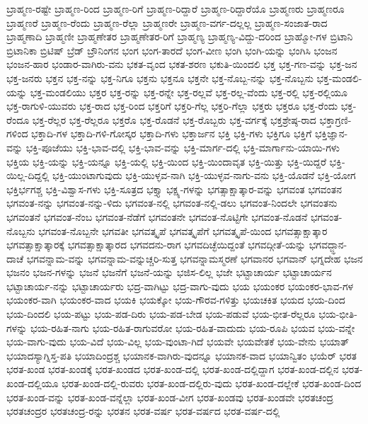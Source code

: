 {ಬ್ರಾಹ್ಮಣ-ರಷ್ಟೇ
ಬ್ರಾಹ್ಮಣ-ರಿಂದ
ಬ್ರಾಹ್ಮಣ-ರಿಗೆ
ಬ್ರಾಹ್ಮಣ-ರಿದ್ದಾರೆ
ಬ್ರಾಹ್ಮಣ-ರಿದ್ದಾರೆಯೊ
ಬ್ರಾಹ್ಮಣರು
ಬ್ರಾಹ್ಮಣರೂ
ಬ್ರಾಹ್ಮಣರೆ
ಬ್ರಾಹ್ಮಣ-ರೆಂದು
ಬ್ರಾಹ್ಮಣ-ರೆಲ್ಲಾ
ಬ್ರಾಹ್ಮಣರೇ
ಬ್ರಾಹ್ಮಣ-ವರ್ಗ-ದಲ್ಲಲ್ಲ
ಬ್ರಾಹ್ಮಣ-ಸಂಜಾತ-ರಾದ
ಬ್ರಾಹ್ಮಣಾದಿ
ಬ್ರಾಹ್ಮಣೀ
ಬ್ರಾಹ್ಮಣೇತರ
ಬ್ರಾಹ್ಮಣೇತರ-ರಿಗೆ
ಬ್ರಾಹ್ಮಣ್ಯ
ಬ್ರಾಹ್ಮಣ್ಯ-ವಿದ್ದು-ದರಿಂದ
ಬ್ರಾಹ್ಮೋ-ಗಳ
ಬ್ರಿಟಾನಿ
ಬ್ರಿಟಾನಿಕಾ
ಬ್ರಿಟಿಷ್
ಬ್ರೆಡ್
ಬ್ರೌನಿಂಗನ
ಭಂಗ
ಭಂಗ-ತಾರದೆ
ಭಂಗ-ವೀಣ
ಭಂಗಿ
ಭಂಗಿ-ಯನ್ನು
ಭಂಗಿಸಿ
ಭಂಜನ
ಭಂಜನ-ಹಾರ
ಭಂಡಾರ-ವಾಗಿರು-ವನು
ಭಕತ-ವೃಂದ
ಭಕತ-ಶರಣ
ಭಕುತಿ-ಯಿಂದಲಿ
ಭಕ್ತ
ಭಕ್ತ-ಗಣ-ವನ್ನು
ಭಕ್ತ-ಜನ
ಭಕ್ತ-ಜನರು
ಭಕ್ತನ
ಭಕ್ತ-ನನ್ನು
ಭಕ್ತ-ನಿಗೂ
ಭಕ್ತನು
ಭಕ್ತನೂ
ಭಕ್ತನೇ
ಭಕ್ತ-ನೊಬ್ಬ-ನನ್ನು
ಭಕ್ತ-ನೊಬ್ಬನು
ಭಕ್ತ-ಮಂಡಲಿ-ಯನ್ನು
ಭಕ್ತ-ಮಂಡಲಿಯು
ಭಕ್ತರ
ಭಕ್ತ-ರನ್ನು
ಭಕ್ತ-ರನ್ನೇ
ಭಕ್ತ-ರಲ್ಲವೆ
ಭಕ್ತ-ರಲ್ಲ-ವೆಂದು
ಭಕ್ತ-ರಲ್ಲಿ
ಭಕ್ತ-ರಲ್ಲಿಯೂ
ಭಕ್ತ-ರಾಗುಳಿ-ಯುವರು
ಭಕ್ತ-ರಾದ
ಭಕ್ತ-ರಿಂದ
ಭಕ್ತರಿಗೆ
ಭಕ್ತರಿ-ಗೆಲ್ಲ
ಭಕ್ತರಿ-ಗೆಲ್ಲಾ
ಭಕ್ತರು
ಭಕ್ತರೂ
ಭಕ್ತ-ರೆಂದು
ಭಕ್ತ-ರೆಂದೂ
ಭಕ್ತ-ರೆಲ್ಲರ
ಭಕ್ತ-ರೆಲ್ಲರೂ
ಭಕ್ತರೊ
ಭಕ್ತ-ರೊಡನೆ
ಭಕ್ತ-ರೊಬ್ಬರು
ಭಕ್ತ-ವರ್ಗಕ್ಕೆ
ಭಕ್ತಶ್ರೇಷ್ಠ-ರಾದ
ಭಕ್ತಾಗ್ರಣಿ-ಗಳಿಂದ
ಭಕ್ತಾದಿ-ಗಳ
ಭಕ್ತಾದಿ-ಗಳಿ-ಗೋಸ್ಕರ
ಭಕ್ತಾದಿ-ಗಳು
ಭಕ್ತಾರ್ಜನ
ಭಕ್ತಿ
ಭಕ್ತಿ-ಗಳು
ಭಕ್ತಿಗೂ
ಭಕ್ತಿಗೆ
ಭಕ್ತಿಜ್ಞಾನ-ವನ್ನು
ಭಕ್ತಿ-ಪೂಜೆಯು
ಭಕ್ತಿ-ಭಾವ-ದಲ್ಲಿ
ಭಕ್ತಿ-ಭಾವ-ವನ್ನು
ಭಕ್ತಿ-ಮಾರ್ಗ-ದಲ್ಲಿ
ಭಕ್ತಿ-ಮಾರ್ಗಾನು-ಯಾಯಿ-ಗಳು
ಭಕ್ತಿಯ
ಭಕ್ತಿ-ಯನ್ನು
ಭಕ್ತಿ-ಯನ್ನೂ
ಭಕ್ತಿ-ಯಲ್ಲಿ
ಭಕ್ತಿ-ಯಿಂದ
ಭಕ್ತಿ-ಯಿಂದಾವೃತ
ಭಕ್ತಿ-ಯಿತ್ತು
ಭಕ್ತಿ-ಯಿದ್ದರೆ
ಭಕ್ತಿ-ಯಿಲ್ಲ-ದಿದ್ದಲ್ಲಿ
ಭಕ್ತಿ-ಯುಂಟಾಗುವುದು
ಭಕ್ತಿ-ಯುಳ್ಳವ-ನಾಗಿ
ಭಕ್ತಿ-ಯುಳ್ಳವ-ನಾಗು-ವನು
ಭಕ್ತಿ-ಯೊಡನೆ
ಭಕ್ತಿ-ಯೋಗ
ಭಕ್ತಿರ್ಭಗಶ್ಚ
ಭಕ್ತಿ-ವಿಶ್ವಾಸ-ಗಳು
ಭಕ್ತಿ-ಸೂತ್ರದ
ಭಕ್ತ್ಯಾ
ಭಕ್ಷ್ಯ-ಗಳನ್ನು
ಭಗತ್ಸಾಕ್ಷಾತ್ಕಾರ-ವನ್ನು
ಭಗವಂತ
ಭಗವಂತನ
ಭಗವಂತ-ನನ್ನು
ಭಗವಂತ-ನನ್ನು-ಳಿದು
ಭಗವಂತ-ನಲ್ಲಿ
ಭಗವಂತ-ನಲ್ಲಿ-ಡಲು
ಭಗವಂತ-ನಿಂದಲೇ
ಭಗವಂತನು
ಭಗವಂತನೆ
ಭಗವಂತ-ನೆಂಬ
ಭಗವಂತ-ನೆಡೆಗೆ
ಭಗವಂತನೇ
ಭಗವಂತ-ನೊಟ್ಟಿಗೇ
ಭಗವಂತ-ನೊಡನೆ
ಭಗವಂತ-ನೊಬ್ಬನು
ಭಗವಂತ-ನೊಬ್ಬನೇ
ಭಗವತೀ
ಭಗವತ್ಕೃಪೆ
ಭಗವತ್ಕೃಪೆಗೆ
ಭಗವತ್ಕೃಪೆ-ಯಿಂದ
ಭಗವತ್ಸಾಕ್ಷಾತ್ಕಾರ
ಭಗವತ್ಸಾಕ್ಷಾತ್ಕಾರಕ್ಕೆ
ಭಗವತ್ಸಾಕ್ಷಾತ್ಕಾರದ
ಭಗವದನು-ರಾಗ
ಭಗವದಿಚ್ಛೆಯಿದ್ದಂತೆ
ಭಗವದ್ಗೀತೆ-ಯನ್ನು
ಭಗವದ್ಜ್ಞಾನ-ದಾಚೆ
ಭಗವನ್ನಾಮ-ವನ್ನು
ಭಗವನ್ನಾಮ-ವನ್ನುಚ್ಚರಿ-ಸುತ್ತ
ಭಗವನ್ನಾಮಸ್ಮರಣೆ
ಭಗವಾನರ
ಭಗವಾನ್
ಭಗ್ನದೇಹ
ಭಜನ
ಭಜನಂ
ಭಜನ-ಗಳನ್ನು
ಭಜನೆ
ಭಜನೆಗೆ
ಭಜನೆ-ಯನ್ನು
ಭಜಿಸ-ಲಿಲ್ಲ
ಭಜೇ
ಭಟ್ಟಾಚಾರ್ಯ
ಭಟ್ಟಾಚಾರ್ಯನ
ಭಟ್ಟಾಚಾರ್ಯ-ನನ್ನು
ಭಟ್ಟಾಚಾರ್ಯರು
ಭದ್ರ-ವಾಗಿಟ್ಟು
ಭದ್ರ-ವಾಗು-ವುದು
ಭಯ
ಭಯಂಕರ
ಭಯಂಕರ-ಭಾವ-ಗಳ
ಭಯಂಕರ-ವಾಗಿ
ಭಯಂಕರ-ವಾದ
ಭಯಕಿ
ಭಯಕ್ಕೋ
ಭಯ-ಗೌರವ-ಗಳಿತ್ತು
ಭಯಚಕಿತ
ಭಯದ
ಭಯ-ದಿಂದ
ಭಯ-ದಿಂದಲಿ
ಭಯ-ಪಟ್ಟು
ಭಯ-ಪಡ-ದಿರು
ಭಯ-ಪಡ-ಬೇಡ
ಭಯ-ಪಡುವೆ
ಭಯ-ಭೀತ-ರೆಲ್ಲರೂ
ಭಯ-ಭೀತಿ-ಗಳನ್ನು
ಭಯ-ರಹಿತ-ನಾಗು
ಭಯ-ರಹಿತ-ರಾಗುವರೋ
ಭಯ-ರಹಿತ-ವಾದುದು
ಭಯ-ರೂಪಿ
ಭಯವ
ಭಯ-ವನ್ನೇ
ಭಯ-ವಾಗು-ವುದು
ಭಯ-ವಿದೆ
ಭಯ-ವಿಲ್ಲ
ಭಯ-ವುಂಟಾ-ಗಿದೆ
ಭಯವೇ
ಭಯವೇತಕೆ
ಭಯ-ವೇನು
ಭಯಾತ್
ಭಯಾದಸ್ಯಾಗ್ನಿಸ್ತ-ಪತಿ
ಭಯಾದಿಂದ್ರಶ್ಚ
ಭಯಾನಕ-ವಾಗಿರು-ವುದನ್ನೂ
ಭಯಾನಕ-ವಾದ
ಭಯಾನ್ವಿತಂ
ಭಯೆರ್
ಭರತ
ಭರತ-ಖಂಡ
ಭರತ-ಖಂಡಕ್ಕೆ
ಭರತ-ಖಂಡದ
ಭರತ-ಖಂಡ-ದಲ್ಲಿ
ಭರತ-ಖಂಡ-ದಲ್ಲಿದ್ದಾಗ
ಭರತ-ಖಂಡ-ದಲ್ಲಿನ
ಭರತ-ಖಂಡ-ದಲ್ಲಿಯೂ
ಭರತ-ಖಂಡ-ದಲ್ಲಿ-ರುವರು
ಭರತ-ಖಂಡ-ದಲ್ಲಿರು-ವುದು
ಭರತ-ಖಂಡ-ದಲ್ಲೇಕೆ
ಭರತ-ಖಂಡ-ದಿಂದ
ಭರತ-ಖಂಡ-ವನ್ನು
ಭರತ-ಖಂಡ-ವನ್ನೆಲ್ಲಾ
ಭರತ-ಖಂಡ-ವೀಗ
ಭರತ-ಖಂಡವು
ಭರತ-ಖಂಡವೇ
ಭರತಚಂದ್ರ
ಭರತಚಂದ್ರರ
ಭರತಚಂದ್ರ-ರನ್ನು
ಭರತನ
ಭರತ-ವರ್ಷ
ಭರತ-ವರ್ಷದ
ಭರತ-ವರ್ಷ-ದಲ್ಲಿ
}
